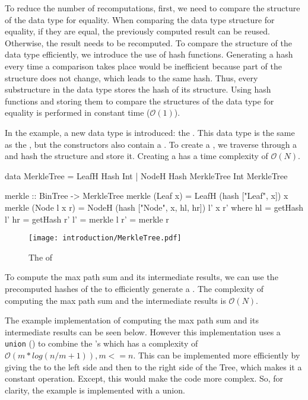 To reduce the number of recomputations, first, we need to compare the structure of the data type for equality. When comparing the data type structure for equality, if they are equal, the previously computed result can be reused. Otherwise, the result needs to be recomputed. To compare the structure of the data type efficiently, we introduce the use of hash functions. Generating a hash every time a comparison takes place would be inefficient because part of the structure does not change, which leads to the same hash. Thus, every substructure in the data type stores the hash of its structure. Using hash functions and storing them to compare the structures of the data type for equality is performed in constant time ($\mathcal{O}(1)$).

In the example, a new data type is introduced: the . This data type is the same as the , but the constructors also contain a . To create a , we traverse through a  and hash the structure and store it. Creating a  has a time complexity of $\mathcal{O}(N)$.

\begin{haskell}
data MerkleTree = LeafH Hash Int
                | NodeH Hash MerkleTree Int MerkleTree

merkle :: BinTree -> MerkleTree
merkle (Leaf x)     = LeafH (hash ["Leaf", x]) x
merkle (Node l x r) = NodeH (hash ["Node", x, hl, hr]) l' x r'
  where
    hl = getHash l'
    hr = getHash r'
    l' = merkle l
    r' = merkle r
\end{haskell}

\begin{figure}[H]
    \centering
    \texttt{[image: introduction/MerkleTree.pdf]}
    \caption{The  of }
\end{figure}

To compute the max path sum and its intermediate results, we can use the precomputed hashes of the  to efficiently generate a . The complexity of computing the max path sum and the intermediate results is $\mathcal{O}(N)$.   

The example implementation of computing the max path sum and its intermediate results can be seen below. However this implementation uses a \texttt{union} (\inlinehaskell{<>}) to combine the 's which has a complexity of $\mathcal{O}(m*log(n/m + 1)), m <= n$\cite{HaskellDataUnion}. This can be implemented more efficiently by giving the  to the left side and then to the right side of the Tree, which makes it a constant operation. Except, this would make the code more complex. So, for clarity, the example is implemented with a union.

